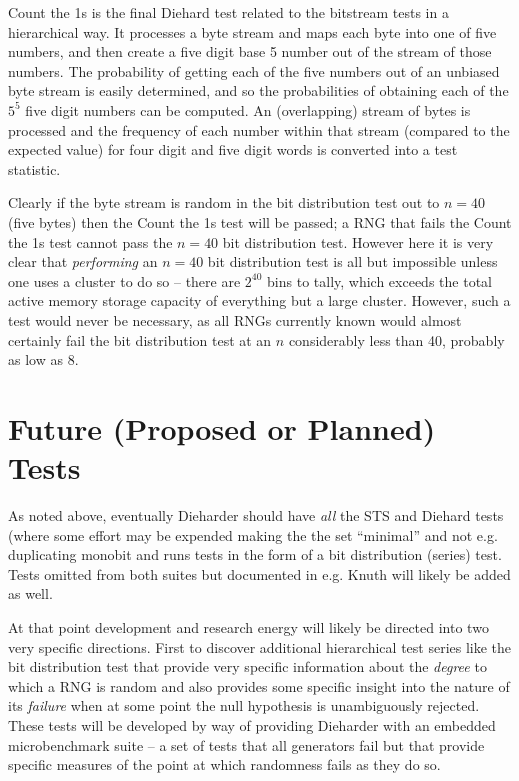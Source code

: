 \documentclass{book}
\begin{document}
Count the 1s is the final Diehard test related to the bitstream tests in
a hierarchical way.  It processes a byte stream and maps each byte into
one of five numbers, and then create a five digit base 5 number out of
the stream of those numbers.  The probability of getting each of the
five numbers out of an unbiased byte stream is easily determined, and so
the probabilities of obtaining each of the $5^5$ five digit numbers can
be computed.  An (overlapping) stream of bytes is processed and the
frequency of each number within that stream (compared to the expected
value) for four digit and five digit words is converted into a test
statistic.

Clearly if the byte stream is random in the bit distribution test out to
$n = 40$ (five bytes) then the Count the 1s test will be passed; a RNG
that fails the Count the 1s test cannot pass the $n = 40$ bit
distribution test.  However here it is very clear that {\em performing}
an $n = 40$ bit distribution test is all but impossible unless one uses
a cluster to do so -- there are $2^40$ bins to tally, which exceeds the
total active memory storage capacity of everything but a large cluster.
However, such a test would never be necessary, as all RNGs currently
known would almost certainly fail the bit distribution test at an $n$
considerably less than 40, probably as low as 8.

\section{Future (Proposed or Planned) Tests}

As noted above, eventually Dieharder should have {\em all} the STS and
Diehard tests (where some effort may be expended making the the set
``minimal'' and not e.g. duplicating monobit and runs tests in the form
of a bit distribution (series) test.  Tests omitted from both suites but
documented in e.g. Knuth will likely be added as well.

At that point development and research energy will likely be directed
into two very specific directions.  First to discover additional
hierarchical test series like the bit distribution test that provide
very specific information about the {\em degree} to which a RNG is
random and also provides some specific insight into the nature of its
{\em failure} when at some point the null hypothesis is unambiguously
rejected.  These tests will be developed by way of providing Dieharder
with an embedded microbenchmark suite -- a set of tests that all
generators fail but that provide specific measures of the point at which
randomness fails as they do so.  
\end{document}
